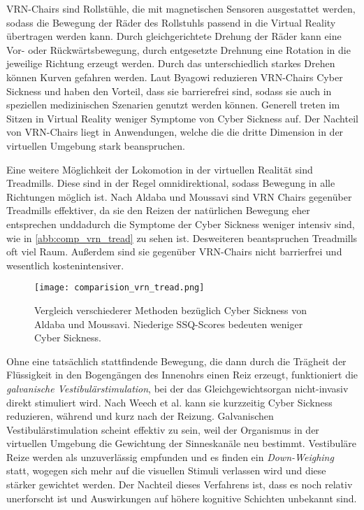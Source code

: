VRN-Chairs sind Rollst\"uhle, die mit magnetischen Sensoren ausgestattet werden, sodass die Bewegung der R\"ader des Rollstuhls passend in die Virtual Reality \"ubertragen werden kann. Durch gleichgerichtete Drehung der R\"ader kann eine Vor- oder R\"uckw\"artsbewegung, durch entgesetzte Drehnung eine Rotation in die jeweilige Richtung erzeugt werden. Durch das unterschiedlich starkes Drehen k\"onnen Kurven gefahren werden. Laut Byagowi\cite{Byagowi:2014:VRNchair} reduzieren VRN-Chairs Cyber Sickness und haben den Vorteil, dass sie barrierefrei sind, sodass sie auch in speziellen medizinischen Szenarien genutzt werden k\"onnen. Generell treten im Sitzen in Virtual Reality weniger Symptome von Cyber Sickness auf. Der Nachteil von VRN-Chairs liegt in Anwendungen, welche die die dritte Dimension in der virtuellen Umgebung stark beanspruchen.

Eine weitere M\"oglichkeit der Lokomotion in der virtuellen Realit\"at sind Treadmills. Diese sind in der Regel omnidirektional, sodass Bewegung in alle Richtungen m\"oglich ist. Nach Aldaba und Moussavi\cite{Aldaba:2019:VRNTread} sind VRN Chairs gegen\"uber Treadmills effektiver, da sie den Reizen der nat\"urlichen Bewegung eher entsprechen unddadurch die Symptome der Cyber Sickness weniger intensiv sind, wie in \autoref{abb:comp_vrn_tread} zu sehen ist. Desweiteren beantspruchen Treadmills oft viel Raum. Au{\ss}erdem sind sie gegen\"uber VRN-Chairs nicht barrierfrei und wesentlich kostenintensiver.
\begin{figure}[h]
	\centering 
	\texttt{[image: comparision\_vrn\_tread.png]}
	\caption{Vergleich verschiederer Methoden bez\"uglich Cyber Sickness von Aldaba und Moussavi\cite{Aldaba:2019:VRNTread}. Niederige SSQ-Scores bedeuten weniger Cyber Sickness.}
	\label{abb:comp_vrn_tread}
\end{figure}

Ohne eine tats\"achlich stattfindende Bewegung, die dann durch die Tr\"agheit der Fl\"ussigkeit in den Bogeng\"angen des Innenohrs einen Reiz erzeugt, funktioniert die \textit{galvanische Vestibul\"arstimulation}, bei der das Gleichgewichtsorgan nicht-invasiv direkt stimuliert wird. Nach Weech et al.\cite{Weech:2020:GVS} kann sie kurzzeitig Cyber Sickness reduzieren, w\"ahrend und kurz nach der Reizung.
Galvanischen Vestibul\"arstimulation scheint effektiv zu sein, weil der Organismus in der virtuellen Umgebung die Gewichtung der Sinneskan\"ale neu bestimmt. Vestibul\"are Reize werden als unzuverl\"assig empfunden und es finden ein \textit{Down-Weighing} statt, wogegen sich mehr auf die visuellen Stimuli verlassen wird und diese st\"arker gewichtet werden.
Der Nachteil dieses Verfahrens ist, dass es noch relativ unerforscht ist und Auswirkungen auf h\"ohere kognitive Schichten unbekannt sind.


